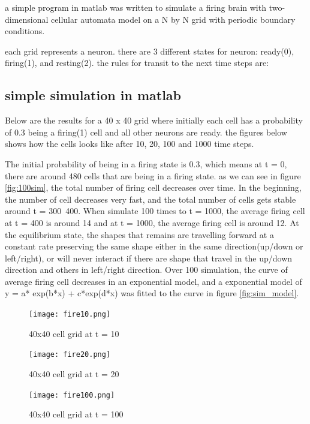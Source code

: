 \documentclass[12pt]{article}
\begin{document}
a simple program in matlab was written to simulate a firing brain with two-dimensional cellular automata model on a N by N grid with periodic boundary conditions.\par

each grid represents a neuron. there are 3 different states for neuron: ready(0), firing(1), and resting(2). 
the rules for transit to the next time steps are:




\subsection{simple simulation in matlab}

Below are the results for a 40 x 40 grid where initially each cell has a probability of 0.3 being a firing(1) cell and all other neurons are ready. the figures below shows how the cells looks like after 10, 20, 100 and 1000 time steps. 

The initial probability of being in a firing state is 0.3, which means at t = 0, there are around 480 cells that are being in a firing state. as we can see in figure \ref{fig:100sim}, the total number of firing cell decreases over time. In the beginning, the number of cell decreases very fast, and the total number of cells gets stable around t = 300~400. When simulate 100 times to t = 1000, the average firing cell at t = 400 is around 14 and at t = 1000, the average firing cell is around 12. At the equilibrium state, the shapes that remains are travelling forward at a constant rate preserving the same shape either in the same direction(up/down or left/right), or will never interact if there are shape that travel in the up/down direction and others in left/right direction. Over 100 simulation, the curve of average firing cell decreases in an exponential model, and a exponential model of y = a* exp(b*x) + c*exp(d*x) was fitted to the curve in figure \ref{fig:sim_model}.


\begin{figure}[H] %
\centering
\texttt{[image: fire10.png]}
\caption{40x40 cell grid at t = 10}
\label{fig:fire10}
\end{figure}

\begin{figure}[H] %
\centering
\texttt{[image: fire20.png]}
\caption{40x40 cell grid at t = 20}
\label{fig:fire20}
\end{figure}

\begin{figure}[H] %
\centering
\texttt{[image: fire100.png]}
\caption{40x40 cell grid at t = 100}
\label{fig:fire100}
\end{figure}
\end{document}
